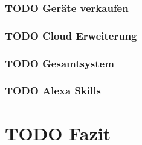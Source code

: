 

\subsubsection{\textbf{TODO} Geräte verkaufen} %


\subsubsection{\textbf{TODO} Cloud Erweiterung} %


\subsubsection{\textbf{TODO} Gesamtsystem} %


\subsubsection{\textbf{TODO} Alexa Skills} %



\section{\textbf{TODO} Fazit}

